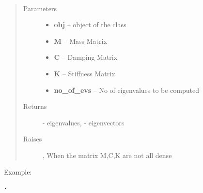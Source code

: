 \documentclass[letterpaper,10pt,english]{sphinxmanual}
\begin{document}
\begin{fulllineitems}
\label{index:brake.solve.solver.qev_dense}~\begin{quote}\begin{description}
\item[{Parameters}] \leavevmode\begin{itemize}
\item {} 
\textbf{obj} -- object of the class 

\item {} 
\textbf{M} -- Mass Matrix

\item {} 
\textbf{C} -- Damping Matrix

\item {} 
\textbf{K} -- Stiffness Matrix

\item {} 
\textbf{no\_of\_evs} -- No of eigenvalues to be computed

\end{itemize}

\item[{Returns}] \leavevmode
{} - eigenvalues,  - eigenvectors

\item[{Raises }] \leavevmode
{}, When the matrix M,C,K are not all dense

\end{description}\end{quote}

Example:

\begin{Verbatim}[commandchars=\\\{\}]
.
\end{Verbatim}

\end{fulllineitems}

\end{document}
